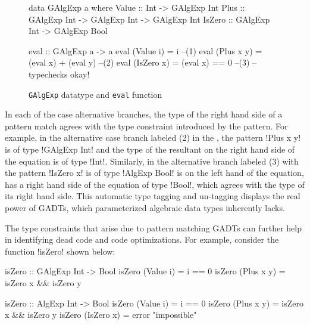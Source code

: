\documentclass[screen,nonacm]{acmart}
\begin{document}
\begin{figure}[ht]
\centering
\begin{minipage}[ht]{0.6\linewidth}
\begin{CenteredBox}
\begin{code}
data GAlgExp a where
  Value  :: Int                        -> GAlgExp Int
  Plus   :: GAlgExp Int -> GAlgExp Int -> GAlgExp Int
  IsZero :: GAlgExp Int                -> GAlgExp Bool
\end{code}
\end{CenteredBox}
\end{minipage}%
\begin{minipage}[ht]{0.4\linewidth}
\begin{CenteredBox}
\begin{code}
eval :: GAlgExp a -> a
eval (Value i) = i                    --(1)
eval (Plus x y) = (eval x) + (eval y) --(2)
eval (IsZero x) = (eval x) == 0       --(3)
                   -- typechecks okay!
\end{code}
\end{CenteredBox}
\end{minipage}%
\caption{\texttt{GAlgExp} datatype and \texttt{eval} function}
\label{fig:galgexp-eval}
\end{figure}

In each of the case alternative branches, the type of the right hand side of a
pattern match agrees with the type constraint introduced by the
pattern. For example, in the alternative case branch labeled (2)
in the , the
pattern !Plus x y! is of type !GAlgExp Int! and the type of the
resultant on the right hand side of the equation is of type !Int!.
Similarly, in the alternative branch labeled (3) with the pattern
!IsZero x! is of type !AlgExp Bool! is on the left hand of the
equation, has a right hand side of the equation
of type !Bool!, which agrees with the type of its right hand side.
This automatic type tagging and un-tagging displays the real power
of GADTs, which parameterized algebraic data types inherently lacks.

The type constraints that arise due to pattern matching GADTs can
further help in identifying dead code and code
optimizations\cite{xi_dead_1998,graf_lower_2020,nilsson_dynamic_2005}.
For example, consider the function !isZero! shown below:

\begin{minipage}[ht]{0.5\linewidth}
\begin{CenteredBox}
\begin{code}
isZero :: GAlgExp Int -> Bool
isZero (Value i) = i == 0
isZero (Plus x y) = isZero x && isZero y
\end{code}
\end{CenteredBox}
\end{minipage}%
\begin{minipage}{0.5\linewidth}
\begin{CenteredBox}
\begin{code}
isZero :: AlgExp Int -> Bool
isZero (Value i) = i == 0
isZero (Plus x y) = isZero x && isZero y
isZero (IsZero x) = error "impossible"
\end{code}
\end{CenteredBox}
\end{minipage}
\end{document}
